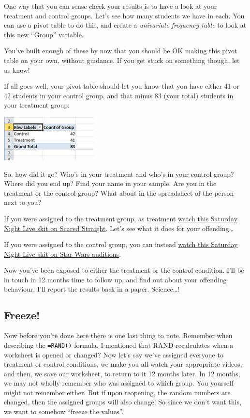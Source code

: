 \documentclass[]{book}
\theoremstyle{definition}
\theoremstyle{definition}
\theoremstyle{definition}
\theoremstyle{remark}
\begin{document}
One way that you can sense check your results is to have a look at your
treatment and control groups. Let's see how many students we have in
each. You can use a pivot table to do this, and create a
\emph{univariate} \emph{frequency table} to look at this new ``Group''
variable.

You've built enough of these by now that you should be OK making this
pivot table on your own, without guidance. If you get stuck on something
though, let us know!

If all goes well, your pivot table should let you know that you have
either 41 or 42 students in your control group, and that minus 83 (your
total) students in your treatment group:

\includegraphics{imgs/freq_groups.png}

So, how did it go? Who's in your treatment and who's in your control
group? Where did you end up? Find your name in your sample. Are you in
the treatment or the control group? What about in the spreadsheet of the
person next to you?

If you were assigned to the treatment group, as treatment
\href{https://www.youtube.com/watch?v=sw1vm_PO8ss}{watch this Saturday
Night Live skit on Scared Straight}. Let's see what it does for your
offending\ldots{}

If you were assigned to the control group, you can instead
\href{https://www.youtube.com/watch?v=-T_pjMr7-n0}{watch this Saturday
Night Live skit on Star Wars auditions}.

Now you've been exposed to either the treatment or the control
condition. I'll be in touch in 12 months time to follow up, and find out
about your offending behaviour. I'll report the results back in a paper.
Science\ldots{}!

\hypertarget{freeze}{%
\subsection{Freeze!}\label{freeze}}

Now before you're done here there is one last thing to note. Remember
when describing the \texttt{=RAND()} formula, I mentioned that RAND
recalculates when a worksheet is opened or changed? Now let's say we've
assigned everyone to treatment or control conditions, we make you all
watch your appropriate videos, and then, we save our worksheet, to
return to it 12 months later. In 12 months, we may not wholly remember
who was assigned to which group. You yourself might not remember either.
But if upon reopening, the random numbers are changed, then the assigned
groups will also change! So since we don't want this, we want to somehow
``freeze the values''.
\end{document}
